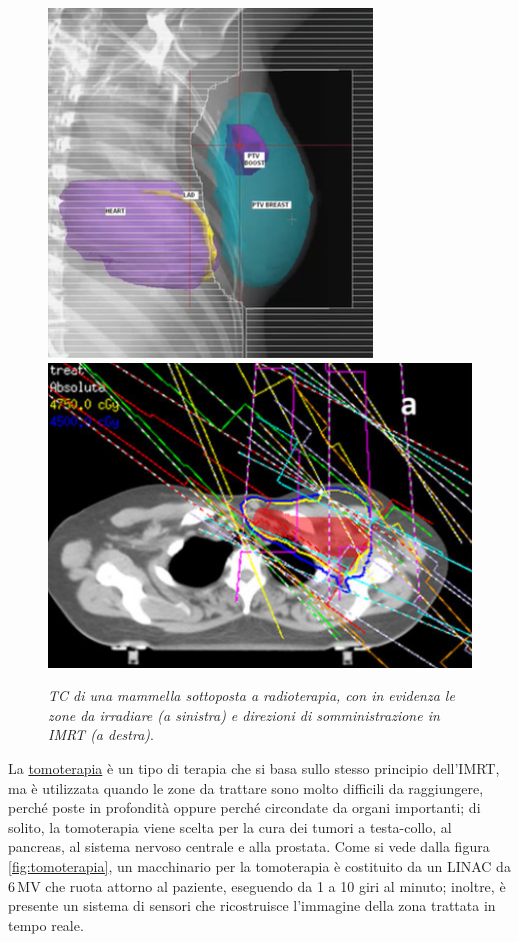 \documentclass{report}
\newcommand{\figref}[1]{figura \ref{#1}}
\numberwithin{equation}{section}
\numberwithin{figure}{section}
\begin{document}
\begin{figure}[htp]
\centering
\includegraphics[scale=0.93]{immagini/mammella.png}\quad\includegraphics[scale=1.04]{immagini/imrt.png}
\caption{\label{fig:mammella} \textit{TC di una mammella sottoposta a radioterapia, con in evidenza le zone da irradiare (a sinistra) e direzioni di somministrazione in IMRT (a destra)}.}
\end{figure}
\vspace{-9 pt}
La \underline{tomoterapia} è un tipo di terapia che si basa sullo stesso principio dell'IMRT, ma è utilizzata quando le zone da trattare sono molto difficili da raggiungere, perché poste in profondità oppure perché circondate da organi importanti; di solito, la tomoterapia viene scelta per la cura dei tumori a testa-collo, al pancreas, al sistema nervoso centrale e alla prostata. Come si vede dalla \figref{fig:tomoterapia}, un macchinario per la tomoterapia è costituito da un LINAC da 6\,MV che ruota attorno al paziente, eseguendo da 1 a 10 giri al minuto; inoltre, è presente un sistema di sensori che ricostruisce l'immagine della zona trattata in tempo reale.
\end{document}
